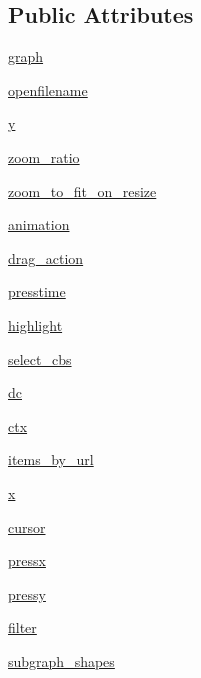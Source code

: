 \subsection*{Public Attributes}
\begin{DoxyCompactItemize}
\item 
\hyperlink{classsmacc__viewer_1_1xdot_1_1wxxdot_1_1WxDotWindow_ab15a1b3b7b919b6b132b067cfba2669a}{graph}
\item 
\hyperlink{classsmacc__viewer_1_1xdot_1_1wxxdot_1_1WxDotWindow_a5ad7e5589b8697223cd75fb03e4c0d93}{openfilename}
\item 
\hyperlink{classsmacc__viewer_1_1xdot_1_1wxxdot_1_1WxDotWindow_add4a798dbd2255643a4dadf0e7cc417c}{y}
\item 
\hyperlink{classsmacc__viewer_1_1xdot_1_1wxxdot_1_1WxDotWindow_ab53373bad50bdff06f2b31afa577fca2}{zoom\+\_\+ratio}
\item 
\hyperlink{classsmacc__viewer_1_1xdot_1_1wxxdot_1_1WxDotWindow_ad624d96f745b20c66119a35fa1d65ae6}{zoom\+\_\+to\+\_\+fit\+\_\+on\+\_\+resize}
\item 
\hyperlink{classsmacc__viewer_1_1xdot_1_1wxxdot_1_1WxDotWindow_a8bb7e6e2d6476d543b3196b886d97bda}{animation}
\item 
\hyperlink{classsmacc__viewer_1_1xdot_1_1wxxdot_1_1WxDotWindow_abc485b8edac4df3626a3c3a811a5d369}{drag\+\_\+action}
\item 
\hyperlink{classsmacc__viewer_1_1xdot_1_1wxxdot_1_1WxDotWindow_ad6804e390609ca08877e64485e55194d}{presstime}
\item 
\hyperlink{classsmacc__viewer_1_1xdot_1_1wxxdot_1_1WxDotWindow_a15b4cfa87927f33d0f0cb3287a23ae7d}{highlight}
\item 
\hyperlink{classsmacc__viewer_1_1xdot_1_1wxxdot_1_1WxDotWindow_ae97c8b9700569078552b57fad8e105b7}{select\+\_\+cbs}
\item 
\hyperlink{classsmacc__viewer_1_1xdot_1_1wxxdot_1_1WxDotWindow_aa04d1fb9f67bc7383a3d551e8d38ee0f}{dc}
\item 
\hyperlink{classsmacc__viewer_1_1xdot_1_1wxxdot_1_1WxDotWindow_aef6feb5be3e3f8af14c96605f09a1168}{ctx}
\item 
\hyperlink{classsmacc__viewer_1_1xdot_1_1wxxdot_1_1WxDotWindow_a6583a761581fbcff431a9781d6cb6194}{items\+\_\+by\+\_\+url}
\item 
\hyperlink{classsmacc__viewer_1_1xdot_1_1wxxdot_1_1WxDotWindow_af93c06ad884159a0fcfba52dcbc0ac54}{x}
\item 
\hyperlink{classsmacc__viewer_1_1xdot_1_1wxxdot_1_1WxDotWindow_ab66a264a4b8e60a95001daf5b393db86}{cursor}
\item 
\hyperlink{classsmacc__viewer_1_1xdot_1_1wxxdot_1_1WxDotWindow_a2976e51e248296a84e56f8aac1f38478}{pressx}
\item 
\hyperlink{classsmacc__viewer_1_1xdot_1_1wxxdot_1_1WxDotWindow_ad89ed9b6cee063586d45ca27a1c4b016}{pressy}
\item 
\hyperlink{classsmacc__viewer_1_1xdot_1_1wxxdot_1_1WxDotWindow_a5e101de60b007a1b4b108f2d82ac0556}{filter}
\item 
\hyperlink{classsmacc__viewer_1_1xdot_1_1wxxdot_1_1WxDotWindow_a05a20a1eb95d32c17486716fc2d47d35}{subgraph\+\_\+shapes}
\end{DoxyCompactItemize}
